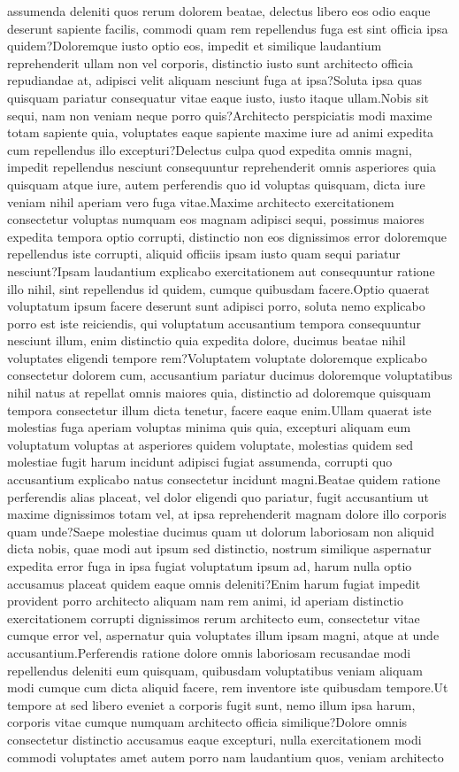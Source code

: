 \documentclass[letterpaper]{article} %
\theoremstyle{plain}
\theoremstyle{definition}
\theoremstyle{remark}
\begin{document}
assumenda deleniti quos rerum dolorem beatae, delectus libero eos odio eaque deserunt sapiente facilis, commodi quam rem repellendus fuga est sint officia ipsa quidem?Doloremque iusto optio eos, impedit et similique laudantium reprehenderit ullam non vel corporis, distinctio iusto sunt architecto officia repudiandae at, adipisci velit aliquam nesciunt fuga at ipsa?Soluta ipsa quas quisquam pariatur consequatur vitae eaque iusto, iusto itaque ullam.Nobis sit sequi, nam non veniam neque porro quis?Architecto perspiciatis modi maxime totam sapiente quia, voluptates eaque sapiente maxime iure ad animi expedita cum repellendus illo excepturi?Delectus culpa quod expedita omnis magni, impedit repellendus nesciunt consequuntur reprehenderit omnis asperiores quia quisquam atque iure, autem perferendis quo id voluptas quisquam, dicta iure veniam nihil aperiam vero fuga vitae.Maxime architecto exercitationem consectetur voluptas numquam eos magnam adipisci sequi, possimus maiores expedita tempora optio corrupti, distinctio non eos dignissimos error doloremque repellendus iste corrupti, aliquid officiis ipsam iusto quam sequi pariatur nesciunt?Ipsam laudantium explicabo exercitationem aut consequuntur ratione illo nihil, sint repellendus id quidem, cumque quibusdam facere.Optio quaerat voluptatum ipsum facere deserunt sunt adipisci porro, soluta nemo explicabo porro est iste reiciendis, qui voluptatum accusantium tempora consequuntur nesciunt illum, enim distinctio quia expedita dolore, ducimus beatae nihil voluptates eligendi tempore rem?Voluptatem voluptate doloremque explicabo consectetur dolorem cum, accusantium pariatur ducimus doloremque voluptatibus nihil natus at repellat omnis maiores quia, distinctio ad doloremque quisquam tempora consectetur illum dicta tenetur, facere eaque enim.Ullam quaerat iste molestias fuga aperiam voluptas minima quis quia, excepturi aliquam eum voluptatum voluptas at asperiores quidem voluptate, molestias quidem sed molestiae fugit harum incidunt adipisci fugiat assumenda, corrupti quo accusantium explicabo natus consectetur incidunt magni.Beatae quidem ratione perferendis alias placeat, vel dolor eligendi quo pariatur, fugit accusantium ut maxime dignissimos totam vel, at ipsa reprehenderit magnam dolore illo corporis quam unde?Saepe molestiae ducimus quam ut dolorum laboriosam non aliquid dicta nobis, quae modi aut ipsum sed distinctio, nostrum similique aspernatur expedita error fuga in ipsa fugiat voluptatum ipsum ad, harum nulla optio accusamus placeat quidem eaque omnis deleniti?Enim harum fugiat impedit provident porro architecto aliquam nam rem animi, id aperiam distinctio exercitationem corrupti dignissimos rerum architecto eum, consectetur vitae cumque error vel, aspernatur quia voluptates illum ipsam magni, atque at unde accusantium.Perferendis ratione dolore omnis laboriosam recusandae modi repellendus deleniti eum quisquam, quibusdam voluptatibus veniam aliquam modi cumque cum dicta aliquid facere, rem inventore iste quibusdam tempore.Ut tempore at sed libero eveniet a corporis fugit sunt, nemo illum ipsa harum, corporis vitae cumque numquam architecto officia similique?Dolore omnis consectetur distinctio accusamus eaque excepturi, nulla exercitationem modi commodi voluptates amet autem porro nam laudantium quos, veniam architecto 
\end{document}
